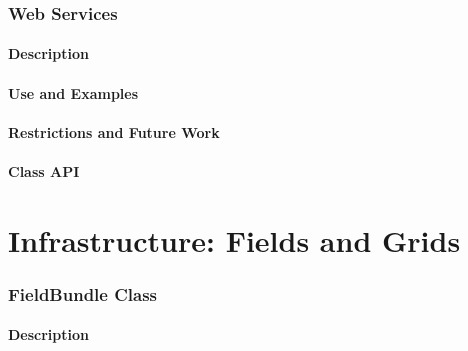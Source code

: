 \documentclass[english]{article}
\begin{document}
\section{Web Services}
\subsection{Description}

\subsection{Use and Examples}


\subsection{Restrictions and Future Work}

\subsection{Class API}

\newpage
\begin{htmlonly}
\end{htmlonly}
\part{Infrastructure: Fields and Grids}
\newpage

%
\newpage
\section{FieldBundle Class}
\subsection{Description}

%
%
\end{document}
